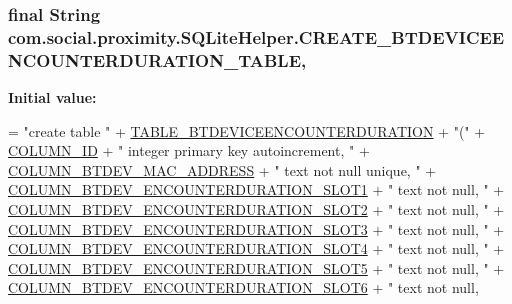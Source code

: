 \subsubsection[{C\+R\+E\+A\+T\+E\+\_\+\+B\+T\+D\+E\+V\+I\+C\+E\+E\+N\+C\+O\+U\+N\+T\+E\+R\+D\+U\+R\+A\+T\+I\+O\+N\+\_\+\+T\+A\+B\+L\+E}]{\setlength{\rightskip}{0pt plus 5cm}final String com.\+social.\+proximity.\+S\+Q\+Lite\+Helper.\+C\+R\+E\+A\+T\+E\+\_\+\+B\+T\+D\+E\+V\+I\+C\+E\+E\+N\+C\+O\+U\+N\+T\+E\+R\+D\+U\+R\+A\+T\+I\+O\+N\+\_\+\+T\+A\+B\+L\+E\hspace{0.3cm}{\ttfamily [static]}, {\ttfamily [private]}}\label{classcom_1_1social_1_1proximity_1_1_s_q_lite_helper_aa47200bd55a879de8afff2709a50cc76}
{\bfseries Initial value\+:}
\begin{DoxyCode}
= \textcolor{stringliteral}{"create table "}
              + \hyperlink{classcom_1_1social_1_1proximity_1_1_s_q_lite_helper_a7a34326231133feb3823c4fa9284e729}{TABLE\_BTDEVICEENCOUNTERDURATION} + \textcolor{stringliteral}{"("}
              + \hyperlink{classcom_1_1social_1_1proximity_1_1_s_q_lite_helper_ae0e5a93fedecddb46106b02b939e4601}{COLUMN\_ID} + \textcolor{stringliteral}{" integer primary key autoincrement, "}
              + \hyperlink{classcom_1_1social_1_1proximity_1_1_s_q_lite_helper_a24fb4cdd15815c0527eecadbb7fb5f12}{COLUMN\_BTDEV\_MAC\_ADDRESS} + \textcolor{stringliteral}{" text not null unique, "}
              + \hyperlink{classcom_1_1social_1_1proximity_1_1_s_q_lite_helper_a868a3972f2b8525dc6f9405ced3646a1}{COLUMN\_BTDEV\_ENCOUNTERDURATION\_SLOT1} + \textcolor{stringliteral}{" text not null,
       "}
              + \hyperlink{classcom_1_1social_1_1proximity_1_1_s_q_lite_helper_a5c34a24458903b46541f5f6464fc5158}{COLUMN\_BTDEV\_ENCOUNTERDURATION\_SLOT2} + \textcolor{stringliteral}{" text not null,
       "}
              + \hyperlink{classcom_1_1social_1_1proximity_1_1_s_q_lite_helper_ab17d2432d4955f20c86940a793b391d7}{COLUMN\_BTDEV\_ENCOUNTERDURATION\_SLOT3} + \textcolor{stringliteral}{" text not null,
       "}
              + \hyperlink{classcom_1_1social_1_1proximity_1_1_s_q_lite_helper_a09a133f4146b7472d28124a3f783b7b9}{COLUMN\_BTDEV\_ENCOUNTERDURATION\_SLOT4} + \textcolor{stringliteral}{" text not null,
       "}
              + \hyperlink{classcom_1_1social_1_1proximity_1_1_s_q_lite_helper_ac3454a41a32eb6c763bcc1b4730485a5}{COLUMN\_BTDEV\_ENCOUNTERDURATION\_SLOT5} + \textcolor{stringliteral}{" text not null,
       "}
              + \hyperlink{classcom_1_1social_1_1proximity_1_1_s_q_lite_helper_a71abceb54b8d7f3d2cd4029fc2216b27}{COLUMN\_BTDEV\_ENCOUNTERDURATION\_SLOT6} + \textcolor{stringliteral}{" text not null,
}
\end{DoxyCode}
